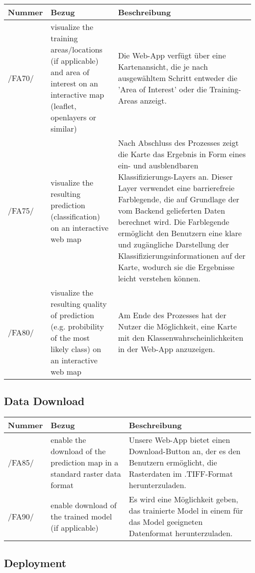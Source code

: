 \documentclass[a4paper,12pt]{article}
\newcommand{\addrow}[3]{#1 &#2 &#3 \\ [0.2cm]}
\newcommand{\addheading}[3]{#1 &#2 &#3\\ \hline }
\newcommand{\tabularhead}{\begin{tabular}{l p{5cm} p{8cm}}
\hline
}
\newenvironment{usecase}{\tabularhead}
{\hline\end{tabular}}
\begin{document}
\begin{usecase}
  \addheading{Nummer}{Bezug}{Beschreibung} 
  \addrow{/FA70/}{visualize the training areas/locations (if applicable) and area of interest on an interactive map (leaflet, openlayers or similar)}{Die Web-App verfügt über eine Kartenansicht, die je nach ausgewähltem Schritt entweder die 'Area of Interest' oder die Training-Areas anzeigt.}
  \addrow{/FA75/}{visualize the resulting prediction (classification) on an interactive web map}{Nach Abschluss des Prozesses zeigt die Karte das Ergebnis in Form eines ein- und ausblendbaren Klassifizierungs-Layers an. Dieser Layer verwendet eine barrierefreie Farblegende, die auf Grundlage der vom Backend gelieferten Daten berechnet wird. Die Farblegende ermöglicht den Benutzern eine klare und zugängliche Darstellung der Klassifizierungsinformationen auf der Karte, wodurch sie die Ergebnisse leicht verstehen können.}
  \addrow{/FA80/}{visualize the resulting quality of prediction (e.g. probibility of
the most likely class) on an interactive web map}{Am Ende des Prozesses hat der Nutzer die Möglichkeit, eine Karte mit den Klassenwahrscheinlichkeiten in der Web-App anzuzeigen.}

\end{usecase}

\subsection{Data Download}

\begin{usecase}
  \addheading{Nummer}{Bezug}{Beschreibung} 
  \addrow{/FA85/}{enable the download of the prediction map in a standard raster data format}{  Unsere Web-App bietet einen Download-Button an, der es den Benutzern ermöglicht, die Rasterdaten im .TIFF-Format herunterzuladen.}
  \addrow{/FA90/}{enable download of the trained model (if applicable)}{Es wird eine Möglichkeit geben, das trainierte Model in einem für das Model geeigneten Datenformat herunterzuladen.}

\end{usecase}

\subsection{Deployment}
\end{document}
